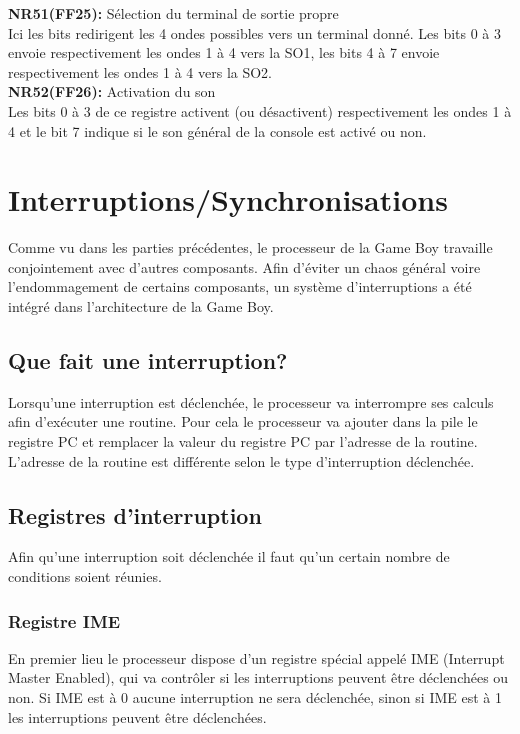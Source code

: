\documentclass{report}
\begin{document}
	\textbf{NR51(FF25):} Sélection du terminal de sortie propre \\
		Ici les bits redirigent les 4 ondes possibles vers un
		terminal donné.
		Les bits 0 à 3 envoie respectivement les ondes 1 à 4
		vers la SO1, les bits 4 à 7 envoie respectivement les
		ondes 1 à 4 vers la SO2.\\

	\textbf{NR52(FF26):} Activation du son \\
		Les bits 0 à 3 de ce registre activent (ou
		désactivent) respectivement les ondes 1 à 4 et le bit
		7 indique si le son général de la console est activé
		ou non.
\section{Interruptions/Synchronisations}
Comme vu dans les parties précédentes, le processeur de la Game Boy travaille conjointement avec d'autres composants. Afin d'éviter un chaos général voire l'endommagement de certains composants, un système d'interruptions a été intégré dans l'architecture de la Game Boy.
\subsection{Que fait une interruption?}
Lorsqu'une interruption est déclenchée, le processeur va interrompre ses calculs afin d'exécuter une routine. Pour cela le processeur va ajouter dans la pile le registre PC et remplacer la valeur du registre PC par l'adresse de la routine. L'adresse de la routine est différente selon le type d'interruption déclenchée.
\subsection{Registres d'interruption}
Afin qu'une interruption soit déclenchée il faut qu'un certain nombre de conditions soient réunies.
\subsubsection{Registre IME}
En premier lieu le processeur dispose d'un registre spécial appelé IME (Interrupt Master Enabled), qui va contrôler si les interruptions peuvent être déclenchées ou non. Si IME est à 0 aucune interruption ne sera déclenchée, sinon si IME est à 1 les interruptions peuvent être déclenchées.
\end{document}
